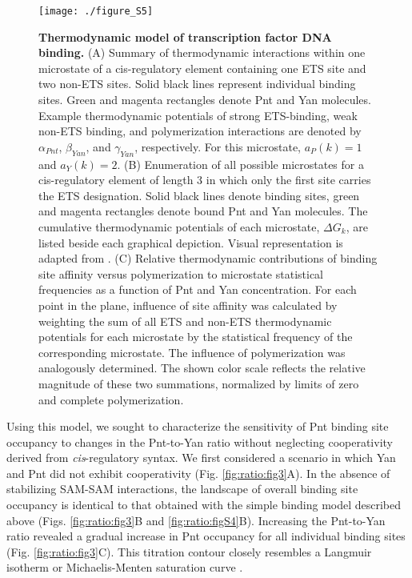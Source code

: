 \begin{figure}[h]
\centering
\texttt{[image: ./figure\_S5]}
\caption[Thermodynamic model of transcription factor DNA binding.]{\textbf{Thermodynamic model of transcription factor DNA binding.} (A) Summary of thermodynamic interactions within one microstate of a cis-regulatory element containing one ETS site and two non-ETS sites. Solid black lines represent individual binding sites. Green and magenta rectangles denote Pnt and Yan molecules. Example thermodynamic potentials of strong ETS-binding, weak non-ETS binding, and polymerization interactions are denoted by $\alpha_{Pnt}$, $\beta_{Yan}$, and $\gamma_{Yan}$, respectively. For this microstate, $a_P(k)=1$ and $a_Y(k)=2$. (B) Enumeration of all possible microstates for a cis-regulatory element of length 3 in which only the first site carries the ETS designation. Solid black lines denote binding sites, green and magenta rectangles denote bound Pnt and Yan molecules. The cumulative thermodynamic potentials of each microstate, $\Delta G_k$, are listed beside each graphical depiction. Visual representation is adapted from \cite{Hope2017}. (C) Relative thermodynamic contributions of binding site affinity versus polymerization to microstate statistical frequencies as a function of Pnt and Yan concentration. For each point in the plane, influence of site affinity was calculated by weighting the sum of all ETS and non-ETS thermodynamic potentials for each microstate by the statistical frequency of the corresponding microstate. The influence of polymerization was analogously determined. The shown color scale reflects the relative magnitude of these two summations, normalized by limits of zero and complete polymerization.}
\label{fig:ratio:figS5}
\end{figure}

Using this model, we sought to characterize the sensitivity of Pnt binding site occupancy to changes in the Pnt-to-Yan ratio without neglecting cooperativity derived from \textit{cis}-regulatory syntax. We first considered a scenario in which Yan and Pnt did not exhibit cooperativity (Fig. \ref{fig:ratio:fig3}A). In the absence of stabilizing SAM-SAM interactions, the landscape of overall binding site occupancy is identical to that obtained with the simple binding model described above (Figs. \ref{fig:ratio:fig3}B and \ref{fig:ratio:figS4}B). Increasing the Pnt-to-Yan ratio revealed a gradual increase in Pnt occupancy for all individual binding sites (Fig. \ref{fig:ratio:fig3}C). This titration contour closely resembles a Langmuir isotherm or Michaelis-Menten saturation curve \cite{Fogler1987}.

